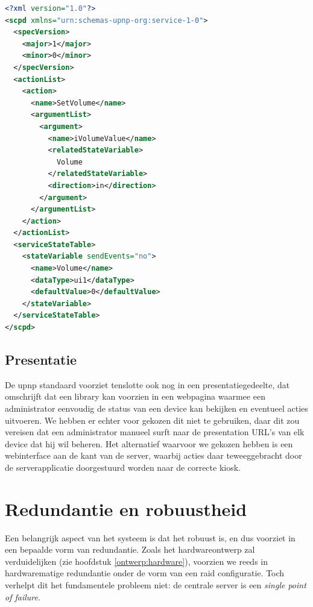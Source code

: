 \begin{lstlisting}[language=XML, float, caption=Voorbeeld van een \acs{scpd} bestand., label=lst:scpd]
<?xml version="1.0"?>
<scpd xmlns="urn:schemas-upnp-org:service-1-0">
  <specVersion>
    <major>1</major>
    <minor>0</minor>
  </specVersion>
  <actionList>
    <action>
      <name>SetVolume</name>
      <argumentList>
        <argument>
          <name>iVolumeValue</name>
          <relatedStateVariable>
            Volume
          </relatedStateVariable>
          <direction>in</direction>
        </argument>
      </argumentList>
    </action>
  </actionList>
  <serviceStateTable>
    <stateVariable sendEvents="no">
      <name>Volume</name>
      <dataType>ui1</dataType>
      <defaultValue>0</defaultValue>
    </stateVariable>
  </serviceStateTable>
</scpd>
\end{lstlisting}

\subsection{Presentatie}

De \ac{upnp} standaard voorziet tenslotte ook nog in een presentatiegedeelte, dat omschrijft dat een library kan voorzien in een webpagina waarmee een administrator eenvoudig de status van een device kan bekijken en eventueel acties uitvoeren. We hebben er echter voor gekozen dit niet te gebruiken, daar dit zou vereisen dat een administrator manueel surft naar de presentation URL's van elk device dat hij wil beheren. Het alternatief waarvoor we gekozen hebben is een webinterface aan de kant van de server, waarbij acties daar teweeggebracht door de serverapplicatie doorgestuurd worden naar de correcte kiosk.

\section{Redundantie en robuustheid}
\label{sec:redundantie}

Een belangrijk aspect van het systeem is dat het robuust is, en dus voorziet in een bepaalde vorm van redundantie. Zoals het hardwareontwerp zal verduidelijken (zie hoofdstuk \ref{ontwerp:hardware}), voorzien we reeds in hardwarematige redundantie onder de vorm van een \ac{raid} configuratie. Toch verhelpt dit het fundamentele probleem niet: de centrale server is een \emph{single point of failure}.

